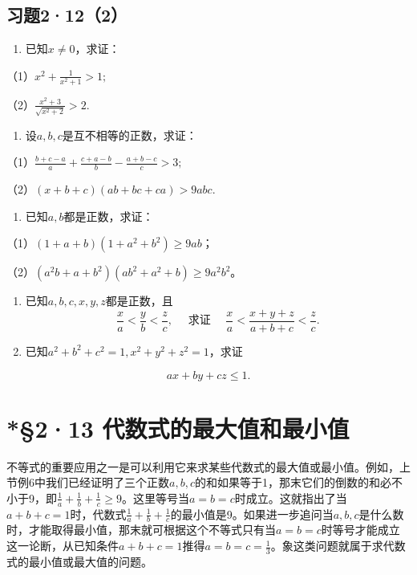 \subsection{习题2·12（2）}

\begin{enumerate}
\item
  已知\(x \neq 0\)，求证：
\end{enumerate}

（1）\(x^{2} + \frac{1}{x^{2} + 1} > 1;\)

（2）\(\frac{x^2 + 3}{\sqrt{x^2 + 2}} > 2.\)

\begin{enumerate}[start=2]
\item
  设\(a, b, c\)是互不相等的正数，求证：
\end{enumerate}

（1）\(\frac{b + c - a}{a} + \frac{c + a - b}{b} - \frac{a + b - c}{c} > 3;\)

（2）\((x + b + c)(ab + bc + ca) > 9abc.\)

\begin{enumerate}[start=3]
\item
  已知\(a, b\)都是正数，求证：
\end{enumerate}

（1）\((1 + a + b)(1 + a^2 + b^2) \geqslant 9ab\)；

（2）\((a^2 b + a + b^2)(ab^2 + a^2 + b) \geqslant 9a^2b^2\)。

\begin{enumerate}[start=4]
\item
  已知\(a, b, c, x, y, z\)都是正数，且
\[
\frac{x}{a} < \frac{y}{b} < \frac{z}{c}, \quad \text{ 求证 } \quad \frac{x}{a} < \frac{x + y + z}{a + b + c} < \frac{z}{c}.
\]
\item
  已知\(a^2 + b^2 + c^2 = 1, x^2 + y^2 + z^2 = 1\)，求证
\end{enumerate}

\[
a x + b y + c z \leqslant 1.
\]

\section{*§2·13 代数式的最大值和最小值}

不等式的重要应用之一是可以利用它来求某些代数式的最大值或最小值。例如，上节例6中我们已经证明了三个正数\(a, b, c\)的和如果等于1，那末它们的倒数的和必不小于9，即\(\frac{1}{a} + \frac{1}{b} + \frac{1}{c} \geqslant 9\)。这里等号当\(a = b = c\)时成立。这就指出了当\(a + b + c = 1\)时，代数式\(\frac{1}{a} + \frac{1}{b} + \frac{1}{c}\)的最小值是9。如果进一步追问当\(a, b, c\)是什么数时，才能取得最小值，那末就可根据这个不等式只有当\(a = b = c\)时等号才能成立这一论断，从已知条件\(a + b + c = 1\)推得\(a = b = c = \frac{1}{3}\)。象这类问题就属于求代数式的最小值或最大值的问题。

